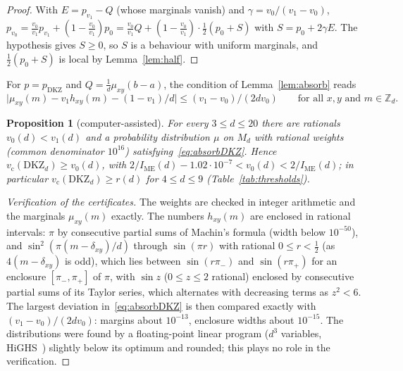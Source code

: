\documentclass[11pt]{article}
\newtheorem{proposition}[lemma]{Proposition}
\theoremstyle{remark}
\numberwithin{equation}{section}
\newcommand{\Z}{\mathbb{Z}}
\newcommand{\IME}{I_{\mathrm{ME}}}
\newcommand{\vc}{v_{\mathrm c}}
\newcommand{\DKZ}{\mathrm{DKZ}}
\begin{document}
\begin{proof}
With $E=p_{v_1}-Q$ (whose marginals vanish) and $\gamma=v_0/(v_1-v_0)$,
$p_{v_0}=\frac{v_0}{v_1}p_{v_1}+(1-\frac{v_0}{v_1})p_0=\frac{v_0}{v_1}Q+(1-\frac{v_0}{v_1})\cdot\frac12(p_0+S)$ with
$S=p_0+2\gamma E$. The hypothesis gives $S\ge0$, so $S$ is a behaviour with uniform marginals, and $\frac12(p_0+S)$ is
local by Lemma~\ref{lem:half}.
\end{proof}

For $p=p_{\DKZ}$ and $Q=\frac1d\mu_{xy}(b-a)$, the condition of Lemma~\ref{lem:absorb} reads
\begin{equation}\label{eq:absorbDKZ}
\bigl|\mu_{xy}(m)-v_1h_{xy}(m)-(1-v_1)/d\bigr|\le(v_1-v_0)/(2dv_0)\qquad\text{for all }x,y\text{ and }m\in\Z_d .
\end{equation}

\begin{proposition}[computer-assisted]\label{prop:dkzcert}
For every $3\le d\le20$ there are rationals $v_0(d)<v_1(d)$ and a probability distribution $\mu$ on $M_d$ with rational
weights \textup{(}common denominator $10^{16}$\textup{)} satisfying~\eqref{eq:absorbDKZ}. Hence $\vc(\DKZ_d)\ge v_0(d)$, with
$2/\IME(d)-1.02\cdot10^{-7}<v_0(d)<2/\IME(d)$; in particular $\vc(\DKZ_d)\ge r(d)$ for $4\le d\le9$
(Table~\ref{tab:thresholds}).
\end{proposition}

\begin{proof}[Verification of the certificates]
The weights are checked in integer arithmetic and the marginals $\mu_{xy}(m)$ exactly. The numbers $h_{xy}(m)$ are
enclosed in rational intervals: $\pi$ by consecutive partial sums of Machin's formula (width below $10^{-50}$), and
$\sin^2(\pi(m-\delta_{xy})/d)$ through $\sin(\pi r)$ with rational $0\le r<\frac12$ (as $4(m-\delta_{xy})$ is odd), which
lies between $\sin(r\pi_-)$ and $\sin(r\pi_+)$ for an enclosure $[\pi_-,\pi_+]$ of $\pi$, with $\sin z$ ($0\le z\le2$
rational) enclosed by consecutive partial sums of its Taylor series, which alternates with decreasing terms as
$z^2<6$. The largest deviation
in~\eqref{eq:absorbDKZ} is then compared exactly with $(v_1-v_0)/(2dv_0)$: margins about $10^{-13}$, enclosure widths
about $10^{-15}$. The distributions were found by a floating-point linear program ($d^3$ variables, HiGHS~\cite{HiGHS})
slightly below its optimum and rounded; this plays no role in the verification.
\end{proof}
\end{document}

